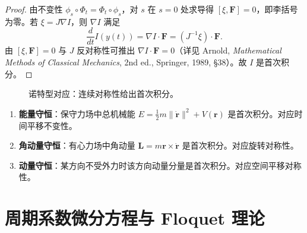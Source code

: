 \begin{proof}
由不变性 $\phi_s \circ \Phi_t = \Phi_t \circ \phi_s$，对 $s$ 在 $s=0$ 处求导得 $[\xi, \mathbf{F}] = 0$，即李括号为零。若 $\xi = J\nabla I$，则 $\nabla I$ 满足
\[
\frac{d}{dt} I(y(t)) = \nabla I \cdot \mathbf{F} = (J^{-1}\xi) \cdot \mathbf{F}.
\]
由 $[\xi, \mathbf{F}] = 0$ 与 $J$ 反对称性可推出 $\nabla I \cdot \mathbf{F} = 0$（详见 Arnold, \textit{Mathematical Methods of Classical Mechanics}, 2nd ed., Springer, 1989, \S{}38）。故 $I$ 是首次积分。
\end{proof}

\begin{figure}[htbp]
\centering
{}
\caption{诺特型对应：连续对称性给出首次积分。}
\label{fig:noether_ode}
\end{figure}

\begin{example}[经典力学中的首次积分]\label{ex:classical_first_integrals}
\begin{enumerate}[label=(\roman*)]
    \item \textbf{能量守恒}：保守力场中总机械能 $E = \frac{1}{2}m\|\dot{\mathbf{r}}\|^2 + V(\mathbf{r})$ 是首次积分。对应时间平移不变性。
    \item \textbf{角动量守恒}：有心力场中角动量 $\mathbf{L} = m \mathbf{r} \times \dot{\mathbf{r}}$ 是首次积分。对应旋转对称性。
    \item \textbf{动量守恒}：某方向不受外力时该方向动量分量是首次积分。对应空间平移对称性。
\end{enumerate}
\end{example}

\section{周期系数微分方程与 Floquet 理论}\label{sec:floquet}

